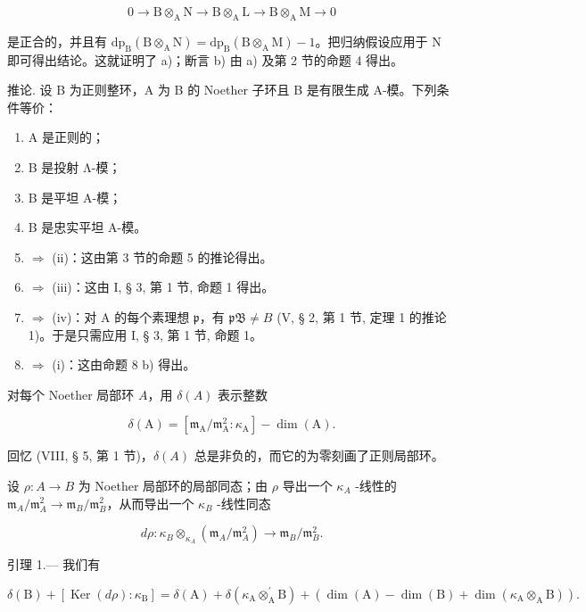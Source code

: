 \[
0 \rightarrow \mathrm{B} \otimes_ {\mathrm{A}} \mathrm{N} \rightarrow \mathrm{B} \otimes_ {\mathrm{A}} \mathrm{L} \rightarrow \mathrm{B} \otimes_ {\mathrm{A}} \mathrm{M} \rightarrow 0
\]

是正合的，并且有 \(\mathrm{dp}_{\mathrm{B}}(\mathrm{B}\otimes_{\mathrm{A}}\mathrm{N}) = \mathrm{dp}_{\mathrm{B}}(\mathrm{B}\otimes_{\mathrm{A}}\mathrm{M}) - 1\)。把归纳假设应用于 N 即可得出结论。这就证明了 a)；断言 b) 由 a) 及第 2 节的命题 4 得出。

推论. 设 B 为正则整环，A 为 B 的 Noether 子环且 B 是有限生成 A-模。下列条件等价：

\begin{enumerate}
\def\labelenumi{(\roman{enumi})}
\item
  A 是正则的；
\item
  B 是投射 Λ-模；
\item
  B 是平坦 A-模；
\item
  B 是忠实平坦 A-模。
\item
  \(\Rightarrow\) (ii)：这由第 3 节的命题 5 的推论得出。
\item
  \(\Rightarrow\) (iii)：这由 I, § 3, 第 1 节, 命题 1 得出。
\item
  \(\Rightarrow\) (iv)：对 A 的每个素理想 \(\mathfrak{p}\)，有 \(\mathfrak{pB} \neq B\) (V, § 2, 第 1 节, 定理 1 的推论 1)。于是只需应用 I, § 3, 第 1 节, 命题 1。
\item
  \(\Rightarrow\) (i)：这由命题 8 b) 得出。
\end{enumerate}

对每个 Noether 局部环 \( A \)，用 \( \delta(A) \) 表示整数

\[
\delta (\mathrm{A}) = \left[ \mathfrak {m} _ {\mathrm{A}} / \mathfrak {m} _ {\mathrm{A}} ^ {2}: \kappa_ {\mathrm{A}} \right] - \dim (\mathrm{A}).
\]

回忆 (VIII, § 5, 第 1 节)，\(\delta(A)\) 总是非负的，而它的为零刻画了正则局部环。

设 \(\rho : A \to B\) 为 Noether 局部环的局部同态；由 \(\rho\) 导出一个 \(\kappa_{A}\) -线性的 \(\mathfrak{m}_{A}/\mathfrak{m}_{A}^{2} \longrightarrow \mathfrak{m}_{B}/\mathfrak{m}_{B}^{2}\)，从而导出一个 \(\kappa_{B}\) -线性同态

\[
d \rho : \kappa_ {B} \otimes_ {\kappa_ {A}} \left(\mathfrak {m} _ {A} / \mathfrak {m} _ {A} ^ {2}\right) \longrightarrow \mathfrak {m} _ {B} / \mathfrak {m} _ {B} ^ {2}.
\]

引理 1.--- 我们有

\[
\delta (\mathrm{B}) + \left[ \operatorname{Ker} (d \rho): \kappa_ {\mathrm{B}} \right] = \delta (\mathrm{A}) + \delta \left(\kappa_ {\mathrm{A}} \otimes_ {\mathrm{A}} ^ {\prime} \mathrm{B}\right) + (\dim (\mathrm{A}) - \dim (\mathrm{B}) + \dim \left(\kappa_ {\mathrm{A}} \otimes_ {\mathrm{A}} \mathrm{B}\right)).
\]

